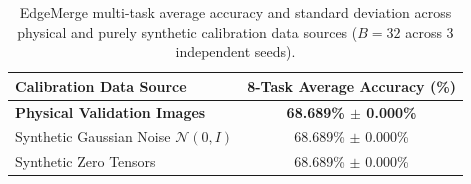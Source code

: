 \documentclass{article}
\theoremstyle{plain}
\theoremstyle{definition}
\theoremstyle{remark}
\begin{document}
\begin{table}[h]
\caption{EdgeMerge multi-task average accuracy and standard deviation across physical and purely synthetic calibration data sources ($B=32$ across 3 independent seeds).}
\label{tab:data_free_ablation}
\vskip 0.15in
\begin{center}
\begin{small}
\begin{sc}
\begin{tabular}{lc}
\toprule
Calibration Data Source & 8-Task Average Accuracy (\%) \\
\midrule
\textbf{Physical Validation Images} & \textbf{68.689\% $\pm$ 0.000\%} \\
Synthetic Gaussian Noise $\mathcal{N}(0, I)$ & 68.689\% $\pm$ 0.000\% \\
Synthetic Zero Tensors & 68.689\% $\pm$ 0.000\% \\
\bottomrule
\end{tabular}
\end{sc}
\end{small}
\end{center}
\vskip -0.1in
\end{table}
\end{document}
